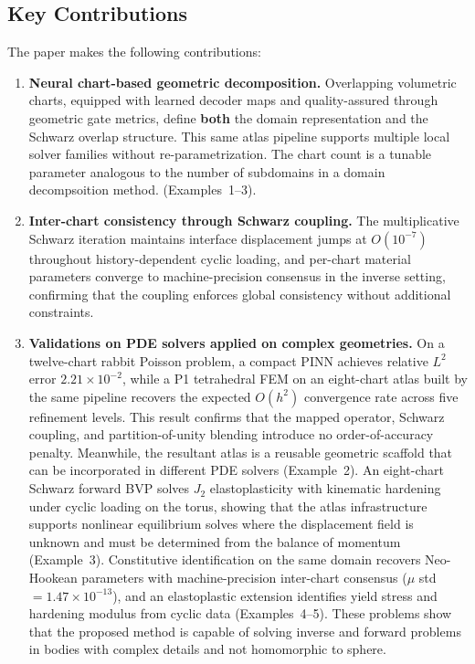 \documentclass[sort&compress]{svjour3} %
\begin{document}
\subsection{Key Contributions}
The paper makes the following contributions:
\begin{enumerate}[leftmargin=*]
\item \textbf{Neural chart-based geometric decomposition.} Overlapping volumetric charts, equipped with learned decoder maps and quality-assured through geometric gate metrics, define \textbf{both} the domain representation and the Schwarz overlap structure. This same atlas pipeline supports multiple local solver families without re-parametrization. The chart count is a tunable parameter analogous to the number of subdomains in a domain decompsoition method. (Examples~1--3).
\item \textbf{Inter-chart consistency through Schwarz coupling.} The multiplicative Schwarz iteration maintains interface displacement jumps at $O(10^{-7})$ throughout history-dependent cyclic loading, and per-chart material parameters converge to machine-precision consensus in the inverse setting, confirming that the coupling enforces global consistency without additional constraints.
\item \textbf{Validations on PDE solvers applied on complex geometries.} On a twelve-chart rabbit Poisson problem, a compact PINN achieves relative $L^2$ error $2.21\times10^{-2}$, while a P1 tetrahedral FEM on an eight-chart atlas built by the same pipeline recovers the expected $O(h^2)$ convergence rate across five refinement levels. This result confirms that the mapped operator, Schwarz coupling, and partition-of-unity blending introduce no order-of-accuracy penalty. Meanwhile, the resultant atlas is a reusable geometric scaffold that can be incorporated in different PDE solvers (Example~2). An eight-chart Schwarz forward BVP solves $J_2$ elastoplasticity with kinematic hardening under cyclic loading on the torus, showing that the atlas infrastructure supports nonlinear equilibrium solves where the displacement field is unknown and must be determined from the balance of momentum (Example~3). Constitutive identification on the same domain recovers Neo-Hookean parameters with machine-precision inter-chart consensus ($\mu$ std $=1.47\times10^{-13}$), and an elastoplastic extension identifies yield stress and hardening modulus from cyclic data (Examples~4--5). These problems show that the proposed method is capable of solving inverse and forward problems in bodies with complex details and not homomorphic to sphere. 
\end{enumerate}
\end{document}
